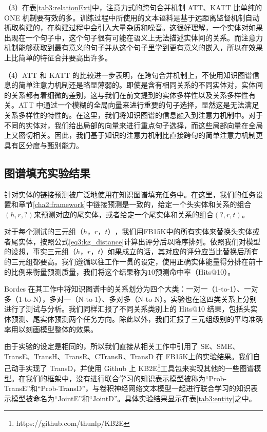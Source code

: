 （3）在表\ref{tab3:relationExt}中，注意力式的跨句合并机制 ATT、KATT 比单纯的 ONE 机制要有效的多。训练过程中所使用的文本语料是基于远距离监督机制自动抓取构建的，在构建过程中会引入大量杂质和噪音。这很好理解，一个实体对如果出现在一个句子中，这个句子很有可能在语义上无法描述实体间的关系。而注意力机制能够获取到最有意义的句子并从这个句子里学到更有意义的嵌入，所以在效果上比简单的特征合并要高出许多。


（4）ATT 和 KATT 的比较进一步表明，在跨句合并机制上，不使用知识图谱信息的简单注意力机制还是略显薄弱的。即使是含有相同关系的不同实体对，实体间的关系都有着细微的差别，这与我们在前文提到的实体多样性以及关系多样性有关。ATT 中通过一个模糊的全局向量来进行重要的句子选择，显然这是无法满足关系多样性的特性的。在这里，我们将知识图谱的信息融入到注意力机制中。对于不同的实体对，我们给出局部的向量来进行重点句子选择，而这些局部向量在全局上又密切相关。因此，我们基于知识的注意力机制比直接跨句的简单注意力机制更具有区分度与甄别能力。

\subsection{图谱填充实验结果}

针对实体的链接预测被广泛地使用在知识图谱填充任务中\cite{bordes2013translating,wang2014transh,lin2015learning}。在这里，我们的任务设置和章节\ref{cha2:framework}中链接预测是一致的，给定一个头实体和关系的组合$(h, r, ?)$来预测对应的尾实体，或者给定一个尾实体和关系的组合$(?, r ,t)$。

对于每个测试的三元组$（h，r，t）$，我们用FB15K中的所有实体来替换头实体或者尾实体，按照公式\ref{eq3:kg_distance}计算出评分后以降序排列。依照我们对模型的设想，事实三元组$（h，r，t）$如果成立的话，其对应的评分应当比替换后所有的三元组都要高。我们遵循以往工作一贯的设定，使用正确实体能量得分排在前十的比例来衡量预测质量，我们将这个结果称为$10$预测命中率（Hits@10）。

Bordes\cite{bordes2013translating} 在其工作中将知识图谱中的关系划分为四个大类：一对一（1-to-1）、一对多（1-to-N），多对一（N-to-1）、多对多（N-to-N）。实验也在这四类关系上分别进行了测试与分析。我们同样汇报了不同关系类别上的 Hits@10 结果，包括头实体预测、尾实体预测两个任务方向。除此以外，我们汇报了三元组级别的平均准确率用以刻画模型整体的效果。

由于实验的设定是相同的，所以我们直接从相关工作\cite{bordes2011learning,bordes2012joint,bordes2013translating,wang2014transh,lin2015learning,ji2015knowledge}中引用了 SE、SME、TransE、TransH、TransR、CTransR、TransD 在 FB15K上的实验结果。我们自己动手实现了 TransD，并使用 Github 上 KB2E\footnote{https://github.com/thunlp/KB2E}工具包来实现其他的一些图谱模型。在我们的框架中，没有进行联合学习的知识表示模型被称为``Prob-TransE''和``Prob-TransD''，与卷积神经网络文本模型一起进行联合学习的知识表示模型被命名为``JointE''和``JointD''。具体实验结果显示在表\ref{tab3:entity}之中。

